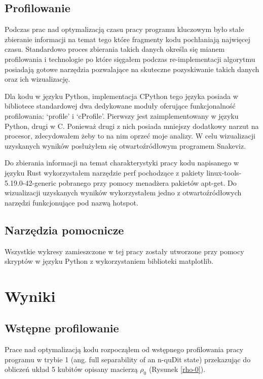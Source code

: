 \documentclass[11pt, a4paper]{article}
\begin{document}
\begin{sloppypar}
    \subsection{Profilowanie}


    Podczas prac nad optymalizacją czasu pracy programu kluczowym było stałe zbieranie
    informacji na temat tego które fragmenty kodu pochłaniają najwięcej czasu. Standardowo
    proces zbierania takich danych określa się mianem profilowania i technologie po które
    sięgałem podczas re-implementacji algorytmu posiadają gotowe narzędzia pozwalające na
    skuteczne pozyskiwanie takich danych oraz ich wizualizację.

    Dla kodu w języku Python, implementacja CPython tego języka posiada w bibliotece
    standardowej dwa dedykowane moduły oferujące funkcjonalność profilowania: `profile' i
    `cProfile'. Pierwszy jest zaimplementowany w języku Python, drugi w C. Ponieważ
    drugi z nich posiada mniejszy dodatkowy narzut na procesor, zdecydowałem żeby to na nim
    oprzeć moje analizy. W celu wizualizacji uzyskanych wyników posłużyłem się
    otwartoźródłowym programem Snakeviz\cite{Snakeviz_PyPI}.

    Do zbierania informacji na temat charakterystyki pracy kodu napisanego w języku Rust
    wykorzystałem narzędzie perf pochodzące z pakiety linux-tools-5.19.0-42-generic
    pobranego przy pomocy menadżera pakietów apt-get. Do wizualizacji uzyskanych wyników
    wykorzystałem jedno z otwartoźródłowych narzędzi funkcjonujące pod nazwą hotspot\cite{HOTSPOT}.

    \subsection{Narzędzia pomocnicze}


    Wszystkie wykresy zamieszczone w tej pracy zostały utworzone przy pomocy skryptów w
    języku Python z wykorzystaniem biblioteki matplotlib\cite{Hunter:2007}.

    \section{Wyniki}


    \subsection{Wstępne profilowanie}


    Prace nad optymalizacją kodu rozpocząłem od wstępnego profilowania pracy programu w trybie
    1 (ang. full separability of an n-quDit state) przekazując do obliczeń układ 5
    kubitów opisany macierzą $\rho_{0}$ (Rysunek \ref{rho-0}).


\end{sloppypar}
\end{document}
